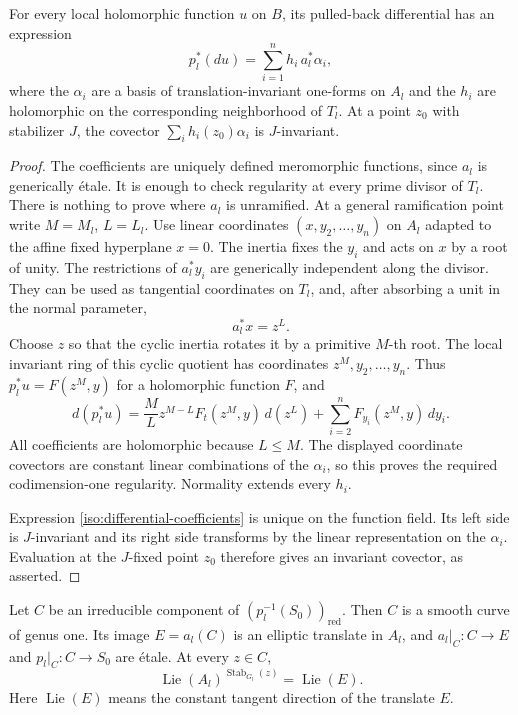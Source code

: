 \begin{lemma}\label{iso:regular-differentials}
For every local holomorphic function \(u\) on \(B\), its pulled-back
differential has an expression
\begin{equation}\label{iso:differential-coefficients}
                 p_l^*(du)=\sum_{i=1}^n h_i\,a_l^*\alpha_i,
\end{equation}
where the \(\alpha_i\) are a basis of translation-invariant
one-forms on \(A_l\) and the \(h_i\) are holomorphic on the
corresponding neighborhood of \(T_l\).
At a point \(z_0\) with stabilizer \(J\), the covector
\(\sum_i h_i(z_0)\alpha_i\) is \(J\)-invariant.
\end{lemma}

\begin{proof}
The coefficients are uniquely defined meromorphic functions, since
\(a_l\) is generically \'{e}tale.
It is enough to check regularity at every prime divisor of \(T_l\).
There is nothing to prove where \(a_l\) is unramified.
At a general ramification point write \(M=M_l\), \(L=L_l\).
Use linear coordinates \((x,y_2,\ldots,y_n)\) on \(A_l\) adapted
to the affine fixed hyperplane \(x=0\).
The inertia fixes the \(y_i\) and acts on \(x\) by a root of unity.
The restrictions of \(a_l^*y_i\) are generically independent along
the divisor.  They can be used as tangential coordinates on
\(T_l\), and, after absorbing a unit in the normal parameter,
\[
                       a_l^*x=z^L.
\]
Choose \(z\) so that the cyclic inertia rotates it by a primitive
\(M\)-th root.  The local invariant ring of this cyclic quotient
has coordinates \(z^M,y_2,\ldots,y_n\).
Thus \(p_l^*u=F(z^M,y)\) for a holomorphic function \(F\), and
\[
 d(p_l^*u)
   =\frac ML z^{M-L}F_t(z^M,y)\,d(z^L)
       +\sum_{i=2}^n F_{y_i}(z^M,y)\,dy_i.
\]
All coefficients are holomorphic because \(L\le M\).
The displayed coordinate covectors are constant linear combinations
of the \(\alpha_i\), so this proves the required codimension-one
regularity.  Normality extends every \(h_i\).

Expression \eqref{iso:differential-coefficients} is unique on the
function field.  Its left side is \(J\)-invariant and its right
side transforms by the linear representation on the \(\alpha_i\).
Evaluation at the \(J\)-fixed point \(z_0\) therefore gives an
invariant covector, as asserted.
\end{proof}

\begin{lemma}\label{iso:elliptic-lift}
Let \(C\) be an irreducible component of
\((p_l^{-1}(S_0))_{\mathrm{red}}\).
Then \(C\) is a smooth curve of genus one.
Its image \(E=a_l(C)\) is an elliptic translate in \(A_l\), and
\(a_l|_C:C\to E\) and \(p_l|_C:C\to S_0\) are \'{e}tale.
At every \(z\in C\),
\[
       \operatorname{Lie}(A_l)^{\operatorname{Stab}_{G_l}(z)}
                            =\operatorname{Lie}(E).
\]
Here \(\operatorname{Lie}(E)\) means the constant tangent direction
of the translate \(E\).
\end{lemma}

